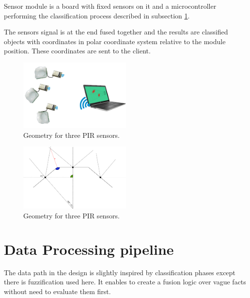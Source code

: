 Sensor module is a board with fixed sensors on it and a microcontroller performing the
classification process described in subsection \ref{label:dataprocessing}.

The sensors signal is at the end fused together and the results are classified objects
with coordinates in polar coordinate system relative to the module position. These
coordinates are sent to the client.

\begin{figure}[h!]
\begin{center}
\includegraphics[width=0.5\textwidth]{obrazky-figures/design.png}
\caption{Geometry for three PIR sensors.\label{fig:design}}
\end{center}
\end{figure}

\begin{figure}[h!]
\begin{center}
\includegraphics[width=0.5\textwidth]{obrazky-figures/3pir_geometry.png}
\caption{Geometry for three PIR sensors.\label{fig:3pir_geometry}}
\end{center}
\end{figure}


\section{Data Processing pipeline}
\label{label:dataprocessing}

The data path in the design is slightly inspired by classification phases except
there is fuzzification used here. It enables to create a fusion logic over vague
facts without need to evaluate them first.

